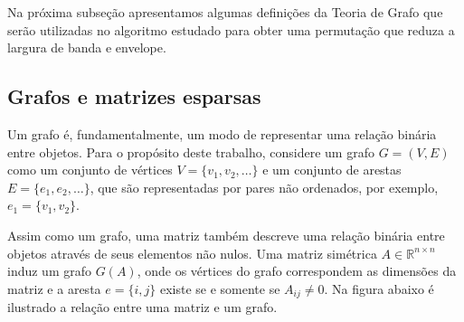 Na próxima subseção apresentamos algumas definições da Teoria de Grafo que
serão utilizadas no algoritmo estudado para obter uma permutação que reduza
a largura de banda e envelope.

\subsection{Grafos e matrizes esparsas}
Um grafo é, fundamentalmente, um modo de representar uma relação binária entre
objetos. Para o propósito deste trabalho, considere um grafo $G = (V, E)$ como
um conjunto de vértices $V = \{v_1, v_2, \ldots \}$ e um conjunto de
arestas $E = \{e_1, e_2, \ldots \}$, que são representadas por pares
não ordenados, por exemplo, $e_1 = \{v_1 , v_2\}$.

Assim como um grafo, uma matriz também descreve uma relação binária entre objetos
através de seus elementos não nulos. Uma matriz simétrica $A \in \mathbb{R}^{n
\times n}$ induz um grafo $G(A)$, onde os vértices do grafo correspondem as
dimensões da matriz e a aresta $e = \{i, j\}$ existe se e somente se $A_{ij} \neq 0$.
Na figura abaixo é ilustrado a relação entre uma matriz e um grafo.
